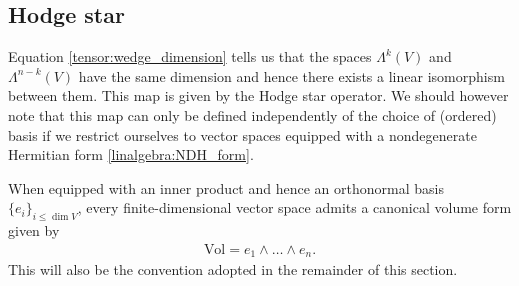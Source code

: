 \subsection{Hodge star}

    Equation \ref{tensor:wedge_dimension} tells us that the spaces $\Lambda^k(V)$ and $\Lambda^{n-k}(V)$ have the same dimension and hence there exists a linear isomorphism between them. This map is given by the Hodge star operator. We should however note that this map can only be defined independently of the choice of (ordered) basis if we restrict ourselves to vector spaces equipped with a nondegenerate Hermitian form \ref{linalgebra:NDH_form}.

    When equipped with an inner product and hence an orthonormal basis $\{e_i\}_{i\leq\dim V}$, every finite-dimensional vector space admits a canonical volume form given by
    \begin{gather}
        \text{Vol} = e_1\wedge\ldots\wedge e_n.
    \end{gather}
    This will also be the convention adopted in the remainder of this section.


